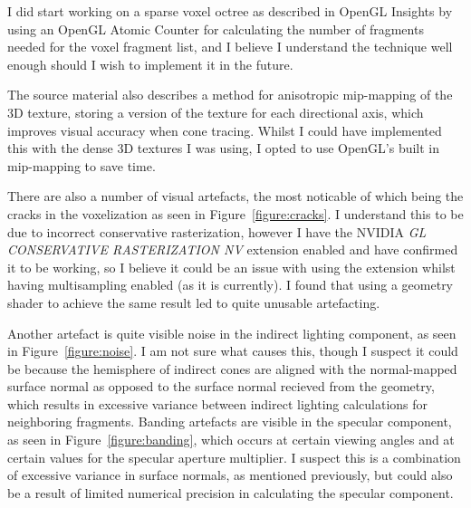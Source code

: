 \documentclass[]{acmsiggraph}
\begin{document}
I did start working on a sparse voxel octree as described in OpenGL Insights \cite{crassingreen2012} by using an OpenGL Atomic Counter for calculating the number of fragments needed for the voxel fragment list, and I believe I understand the technique well enough should I wish to implement it in the future.

The source material \cite{crassinneyretsainzgreeneisemann2011} also describes a method for anisotropic mip-mapping of the 3D texture, storing a version of the texture for each directional axis, which improves visual accuracy when cone tracing. Whilst I could have implemented this with the dense 3D textures I was using, I opted to use OpenGL's built in mip-mapping to save time.

There are also a number of visual artefacts, the most noticable of which being the cracks in the voxelization as seen in Figure~\ref{figure:cracks}. I understand this to be due to incorrect conservative rasterization, however I have the NVIDIA \textit{GL CONSERVATIVE RASTERIZATION NV} extension enabled and have confirmed it to be working, so I believe it could be an issue with using the extension whilst having multisampling enabled (as it is currently). I found that using a geometry shader to achieve the same result led to quite unusable artefacting.

Another artefact is quite visible noise in the indirect lighting component, as seen in Figure~\ref{figure:noise}. I am not sure what causes this, though I suspect it could be because the hemisphere of indirect cones are aligned with the normal-mapped surface normal as opposed to the surface normal recieved from the geometry, which results in excessive variance between indirect lighting calculations for neighboring fragments. Banding artefacts are visible in the specular component, as seen in Figure~\ref{figure:banding}, which occurs at certain viewing angles and at certain values for the specular aperture multiplier. I suspect this is a combination of excessive variance in surface normals, as mentioned previously, but could also be a result of limited numerical precision in calculating the specular component.
\end{document}
